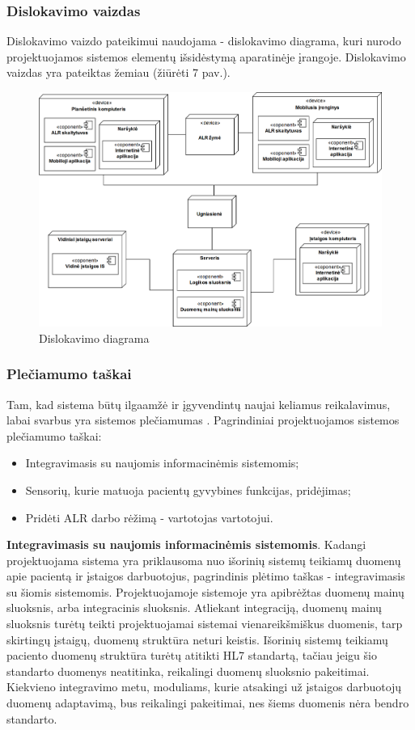 \subsubsection{Dislokavimo vaizdas}
Dislokavimo vaizdo pateikimui naudojama - dislokavimo diagrama, kuri nurodo projektuojamos sistemos elementų išsidėstymą aparatinėje įrangoje. Dislokavimo vaizdas yra pateiktas žemiau (žiūrėti 7 pav.).
\begin{figure}[H]
    \centering
    \includegraphics[scale=0.20]{images/deployment}
    \caption{Dislokavimo diagrama}
\end{figure}

\subsubsection{Plečiamumo taškai}
Tam, kad sistema būtų ilgaamžė ir įgyvendintų naujai keliamus reikalavimus, labai svarbus yra sistemos plečiamumas \cite{Bass2013}. Pagrindiniai projektuojamos sistemos plečiamumo taškai: 
\begin{itemize}
    \item Integravimasis su naujomis informacinėmis sistemomis;
    \item Sensorių, kurie matuoja pacientų gyvybines funkcijas, pridėjimas;
    \item Pridėti ALR darbo rėžimą - vartotojas vartotojui.
\end{itemize}

\textbf{Integravimasis su naujomis informacinėmis sistemomis}. Kadangi projektuojama sistema yra priklausoma nuo išorinių sistemų teikiamų duomenų apie pacientą ir įstaigos darbuotojus, pagrindinis plėtimo taškas - integravimasis su šiomis sistemomis. Projektuojamoje sistemoje yra apibrėžtas duomenų mainų sluoksnis, arba integracinis sluoksnis. Atliekant integraciją, duomenų mainų sluoksnis turėtų teikti projektuojamai sistemai vienareikšmiškus duomenis, tarp skirtingų įstaigų, duomenų struktūra neturi keistis. Išorinių sistemų teikiamų paciento duomenų struktūra turėtų atitikti HL7 standartą, tačiau jeigu šio standarto duomenys neatitinka, reikalingi duomenų sluoksnio pakeitimai. Kiekvieno integravimo metu, moduliams, kurie atsakingi už įstaigos darbuotojų duomenų adaptavimą, bus reikalingi pakeitimai, nes šiems duomenis nėra bendro standarto.


